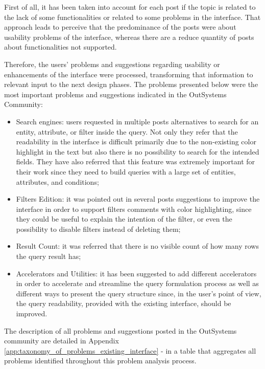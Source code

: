 First of all, it has been taken into account for each post if the topic is related to the lack of some functionalities or related to some problems in the interface. That approach leads to perceive that the predominance of the posts were about usability problems of the interface, whereas there are a reduce quantity of posts about functionalities not supported.

Therefore, the users’ problems and suggestions regarding usability or enhancements of the interface were processed, transforming that information to relevant input to the next design phases. The problems presented below were the most important problems and suggestions indicated in the OutSystems Community:

\begin{itemize}
    \item Search engines: users requested in multiple posts alternatives to search for an entity, attribute, or filter inside the query. Not only they refer that the readability in the interface is difficult primarily due to the non-existing color highlight in the text but also there is no possibility to search for the intended fields. They have also referred that this feature was extremely important for their work since they need to build queries with a large set of entities, attributes, and conditions;
    \item Filters Edition: it was pointed out in several posts suggestions to improve the interface in order to support filters comments with color highlighting, since they could be useful to explain the intention of the filter, or even the possibility to disable filters instead of deleting them;
    \item Result Count: it was referred that there is no visible count of how many rows the query result has;
    \item Accelerators and Utilities: it has been suggested to add different accelerators in order to accelerate and streamline the query formulation process as well as different ways to present the query structure since, in the user's point of view, the query readability, provided with the existing interface, should be improved.
\end{itemize}

The description of all problems and suggestions posted in the OutSystems community are detailed in Appendix \ref{app:taxonomy_of_problems_existing_interface} -  in a table that aggregates all problems identified throughout this problem analysis process.

